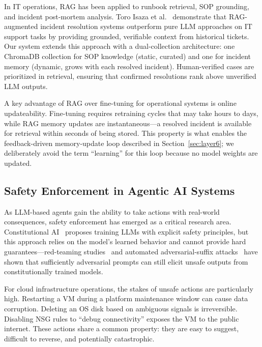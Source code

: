 \documentclass[a4paper,10pt,journal,compsoc]{IEEEtran}
\begin{document}
In IT operations, RAG has been applied to runbook retrieval, SOP
grounding, and incident post-mortem analysis. Toro Isaza et
al.~\cite{isaza2024ragitsupport} demonstrate that RAG-augmented
incident resolution systems outperform pure LLM approaches on IT
support tasks by providing grounded, verifiable context from historical
tickets. Our system extends this approach with a dual-collection
architecture: one ChromaDB collection for SOP knowledge (static,
curated) and one for incident memory (dynamic, grows with each resolved
incident). Human-verified cases are prioritized in retrieval, ensuring
that confirmed resolutions rank above unverified LLM outputs.

A key advantage of RAG over fine-tuning for operational systems is
online updateability. Fine-tuning requires retraining cycles that may
take hours to days, while RAG memory updates are instantaneous---a
resolved incident is available for retrieval within seconds of being
stored. This property is what enables the feedback-driven memory-update
loop described in Section~\ref{sec:layer6}; we deliberately avoid the
term ``learning'' for this loop because no model weights are updated.

\subsection{Safety Enforcement in Agentic AI Systems}

As LLM-based agents gain the ability to take actions with real-world
consequences, safety enforcement has emerged as a critical research
area. Constitutional AI~\cite{bai2022constitutional} proposes training
LLMs with explicit safety principles, but this approach relies on the
model's learned behavior and cannot provide hard guarantees---red-teaming
studies~\cite{perez2022redteaming} and automated adversarial-suffix
attacks~\cite{zou2023universal} have shown that sufficiently adversarial
prompts can still elicit unsafe outputs from constitutionally trained
models.

For cloud infrastructure operations, the stakes of unsafe actions are
particularly high. Restarting a VM during a platform maintenance window
can cause data corruption. Deleting an OS disk based on ambiguous
signals is irreversible. Disabling NSG rules to ``debug connectivity''
exposes the VM to the public internet. These actions share a common
property: they are easy to suggest, difficult to reverse, and
potentially catastrophic.
\end{document}
